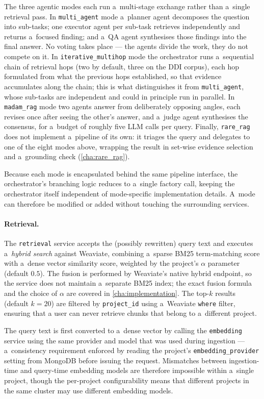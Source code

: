 The three agentic modes each run a~multi-stage exchange rather than a~single
retrieval pass.  In \texttt{multi\_agent} mode a~planner agent decomposes the
question into sub-tasks; one executor agent per sub-task retrieves
independently and returns a~focused finding; and a~QA agent synthesises those
findings into the final answer.  No voting takes place --- the agents divide the
work, they do not compete on it.  In \texttt{iterative\_multihop} mode the
orchestrator runs a~sequential chain of retrieval hops (two by default, three on
the DDI corpus), each hop formulated from what the previous hops established, so
that evidence accumulates along the chain; this is what distinguishes it from
\texttt{multi\_agent}, whose sub-tasks are independent and could in principle run
in parallel.  In \texttt{madam\_rag} mode two agents answer from deliberately
opposing angles, each revises once after seeing the other's answer, and a~judge
agent synthesises the consensus, for a~budget of roughly five LLM calls per query.
Finally, \texttt{rare\_rag} does not implement a~pipeline of its own: it triages
the query and delegates to one of the eight modes above, wrapping the result in
set-wise evidence selection and a~grounding check (\cref{cha:rare_rag}).

Because each mode is encapsulated behind the same pipeline interface, the
orchestrator's branching logic reduces to a~single factory call, keeping the
orchestrator itself independent of mode-specific implementation details.
A~mode can therefore be modified or added without touching the surrounding
services.

\paragraph{Retrieval.}
The \texttt{retrieval} service accepts the (possibly rewritten) query text
and executes a~\emph{hybrid search} against Weaviate, combining a~sparse BM25
term-matching score with a~dense vector similarity score, weighted by the
project's $\alpha$ parameter (default $0.5$).  The fusion is performed by
Weaviate's native hybrid endpoint, so the service does not maintain a~separate
BM25 index; the exact fusion formula and the choice of $\alpha$ are covered in
\cref{cha:implementation}.  The top-$k$ results (default $k = 20$) are filtered
by \texttt{project\_id} using a~Weaviate \texttt{where} filter, ensuring that a
user can never retrieve chunks that belong to a~different project.

The query text is first converted to a~dense vector by calling the
\texttt{embedding} service using the same provider and model that was used
during ingestion --- a~consistency requirement enforced by reading the
project's \texttt{embedding\_provider} setting from MongoDB before issuing
the request.  Mismatches between ingestion-time and query-time embedding
models are therefore impossible within a~single project, though the
per-project configurability means that different projects in the same cluster
may use different embedding models.

